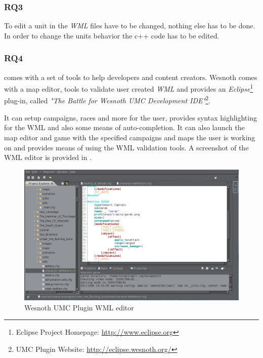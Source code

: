 \subsubsection{RQ3}
To edit a unit in \BOW{} the \textit{WML} files have to be changed, nothing else has to be done. In order to change the
units behavior the c++ code has to be edited.

\subsubsection{RQ4}
\BOW{} comes with a set of tools to help developers and content creators. Wesnoth comes with a  map editor, tools to
validate user created \textit{WML} and provides an \textit{Eclipse}\footnote{Eclipse Project Homepage:
\url{http://www.eclipse.org}} plug-in, called \textit{"The Battle for Wesnoth UMC Development IDE"}\footnote{UMC Plugin
Website: \url{http://eclipse.wesnoth.org/}}.

It can setup
campaigns, races and more for the user, provides syntax highlighting for the WML and also some means of auto-completion. 
It can also launch the map editor and game with the specified campaigns and maps the user is working on and provides
means of using the WML validation tools. A screenshot of the WML editor is provided in .

\begin{figure}[h!]
    \centering
    \includegraphics[width=\textwidth]{pics/wesnothumc}
    \caption{Wesnoth UMC Plugin WML editor}
    \label{fig:wesnothumc}
\end{figure}


